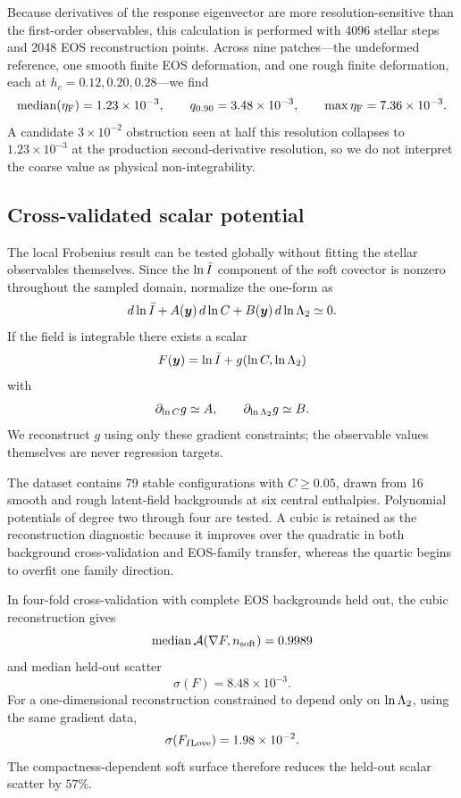 Because derivatives of the response eigenvector are more
resolution-sensitive than the first-order observables, this calculation is
performed with 4096 stellar steps and 2048 EOS reconstruction points.
Across nine patches---the undeformed reference, one smooth finite EOS
deformation, and one rough finite deformation, each at
\(h_c=0.12,0.20,0.28\)---we find
\begin{equation}
    {\rm median}(\eta_{\rm F})=1.23\times10^{-3},
    \qquad
    q_{0.90}=3.48\times10^{-3},
    \qquad
    \max\eta_{\rm F}=7.36\times10^{-3}.
    \label{eq:frobenius-result}
\end{equation}
A candidate \(3\times10^{-2}\) obstruction seen at half this resolution
collapses to \(1.23\times10^{-3}\) at the production
second-derivative resolution, so we do not interpret the coarse value as
physical non-integrability.



\subsection{Cross-validated scalar potential}

The local Frobenius result can be tested globally without fitting the
stellar observables themselves.  Since the \(\ln\bar I\) component of the
soft covector is nonzero throughout the sampled domain, normalize the
one-form as
\begin{equation}
    d\ln\bar I
    +A(\bm{y})\,d\ln C
    +B(\bm{y})\,d\ln\Lambda_2
    \simeq0 .
\end{equation}
If the field is integrable there exists a scalar
\begin{equation}
    F(\bm{y})
    =
    \ln\bar I+g(\ln C,\ln\Lambda_2)
    \label{eq:soft-potential}
\end{equation}
with
\[
\partial_{\ln C}g\simeq A,
\qquad
\partial_{\ln\Lambda_2}g\simeq B .
\]
We reconstruct \(g\) using only these gradient constraints; the observable
values themselves are never regression targets.

The dataset contains 79 stable configurations with \(C\ge0.05\), drawn from
16 smooth and rough latent-field backgrounds at six central enthalpies.
Polynomial potentials of degree two through four are tested.  A cubic is
retained as the reconstruction diagnostic because it improves over the
quadratic in both background cross-validation and EOS-family transfer,
whereas the quartic begins to overfit one family direction.

In four-fold cross-validation with complete EOS backgrounds held out, the
cubic reconstruction gives
\begin{equation}
    {\rm median}\,{\cal A}(\nabla F,n_{\rm soft})=0.9989
\end{equation}
and median held-out scatter
\begin{equation}
    \sigma(F)=8.48\times10^{-3}.
    \label{eq:potential-scatter}
\end{equation}
For a one-dimensional reconstruction constrained to depend only on
\(\ln\Lambda_2\), using the same gradient data,
\[
    \sigma(F_{I{\rm Love}})=1.98\times10^{-2}.
\]
The compactness-dependent soft surface therefore reduces the held-out scalar
scatter by \(57\%\).

